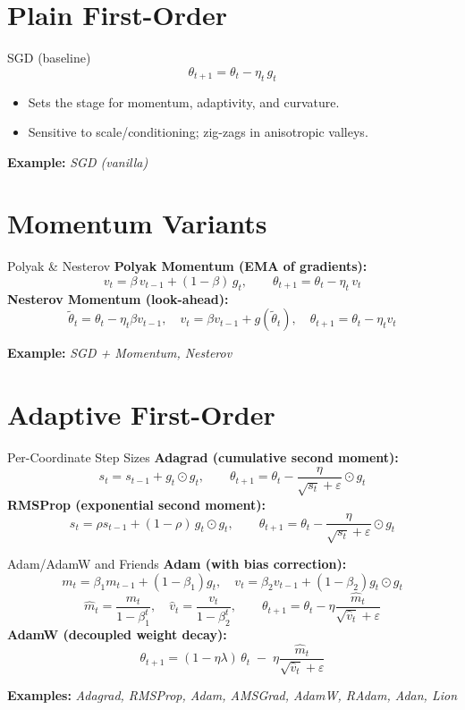\documentclass{beamer}
\begin{document}
\section{Plain First-Order}

\begin{frame}{SGD (baseline) \cite{gradientDescent}}
\[
  \theta_{t+1} = \theta_t - \eta_t\, g_t
\]
\begin{itemize}
  \item Sets the stage for momentum, adaptivity, and curvature.
  \item Sensitive to scale/conditioning; zig-zags in anisotropic valleys.
\end{itemize}
\textbf{Example:} \emph{SGD (vanilla)}
\end{frame}


\section{Momentum Variants}

\begin{frame}{Polyak \& Nesterov}
\textbf{Polyak Momentum (EMA of gradients):}
\[
  v_t = \beta\, v_{t-1} + (1-\beta)\, g_t,\qquad
  \theta_{t+1} = \theta_t - \eta_t\, v_t
\]
\textbf{Nesterov Momentum (look-ahead):}
\[
  \tilde{\theta}_t = \theta_t - \eta_t \beta v_{t-1},\quad
  v_t = \beta v_{t-1} + g(\tilde{\theta}_t),\quad
  \theta_{t+1} = \theta_t - \eta_t v_t
\]

\textbf{Example:} \emph{SGD + Momentum, Nesterov}
\end{frame}


\section{Adaptive First-Order}

\begin{frame}{Per-Coordinate Step Sizes}
\textbf{Adagrad (cumulative second moment):}
\[
  s_t = s_{t-1} + g_t \odot g_t,\qquad
  \theta_{t+1} = \theta_t - \frac{\eta}{\sqrt{s_t} + \varepsilon}\odot g_t
\]
\textbf{RMSProp (exponential second moment):}
\[
  s_t = \rho s_{t-1} + (1-\rho)\, g_t \odot g_t,\qquad
  \theta_{t+1} = \theta_t - \frac{\eta}{\sqrt{s_t} + \varepsilon}\odot g_t
\]
\end{frame}

\begin{frame}{Adam/AdamW and Friends}
\textbf{Adam (with bias correction):}
\[
  m_t=\beta_1 m_{t-1}+(1-\beta_1)g_t,\quad
  v_t=\beta_2 v_{t-1}+(1-\beta_2)g_t\odot g_t
\]
\[
  \hat m_t=\frac{m_t}{1-\beta_1^t},\quad
  \hat v_t=\frac{v_t}{1-\beta_2^t},\qquad
  \theta_{t+1}=\theta_t-\eta \frac{\hat m_t}{\sqrt{\hat v_t}+\varepsilon}
\]
\textbf{AdamW (decoupled weight decay):}
\[
  \theta_{t+1} = (1-\eta\lambda)\,\theta_t \;-\; \eta \frac{\hat m_t}{\sqrt{\hat v_t}+\varepsilon}
\]

\textbf{Examples:} \emph{Adagrad, RMSProp, Adam, AMSGrad, AdamW, RAdam, Adan, Lion}
\end{frame}
\end{document}
